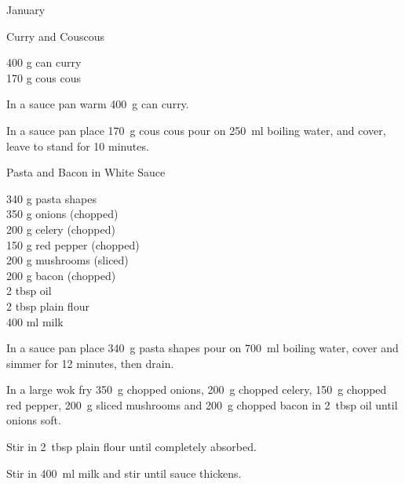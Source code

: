 \begin{menu}{January}
    \begin{recipe}{1}{Curry and Couscous}%
		\begin{ingredients}
		400 g can curry  \\
	170 g cous cous  \\
	
		\end{ingredients}
	
	
	
    \begin{instructions}
    \item 
        In a sauce pan warm
        400~g  can curry.
      \item 
    In a
    sauce pan 
    place
    170~g  cous cous
    pour on
    250~ml  boiling water,
    and cover, leave to stand for 10 minutes.
  
    \end{instructions}
    \end{recipe}%
  
    \begin{recipe}{2}{Pasta and Bacon in White Sauce}%
		\begin{ingredients}
		340 g pasta shapes  \\
	350 g onions (chopped) \\
	200 g celery (chopped) \\
	150 g red pepper (chopped) \\
	200 g mushrooms (sliced) \\
	200 g bacon (chopped) \\
	2 tbsp oil  \\
	2 tbsp plain flour  \\
	400 ml milk  \\
	
		\end{ingredients}
	
	
    \begin{instructions}
    \item 
    In a
    sauce pan
    place
    340~g  pasta shapes
    pour on
    700~ml  boiling water,
    cover and simmer for 12 minutes, then drain.
  \item 
        In a large wok fry
        350~g chopped onions,
        200~g chopped celery,
        150~g chopped red pepper,
        200~g sliced mushrooms
        and
        200~g chopped bacon
        in
        2~tbsp  oil
        until onions soft.
      \item 
        Stir in
        2~tbsp  plain flour
        until completely absorbed.
      \item 
        Stir in
        400~ml  milk
        and stir
        until sauce thickens.
      

\end{instructions}
\end{recipe}
\end{menu}
